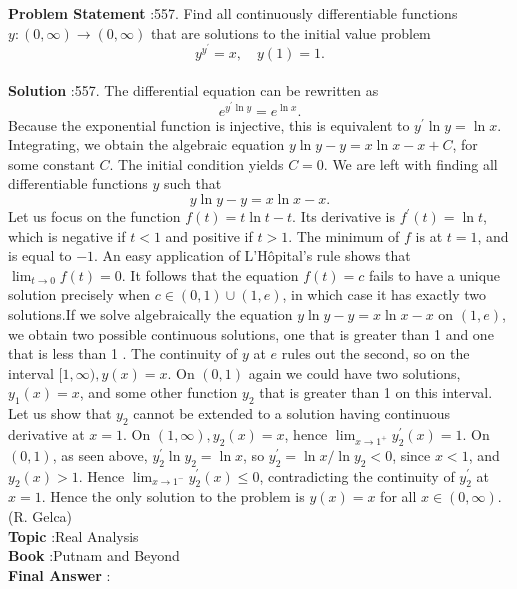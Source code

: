 \documentclass[10pt]{article}
\begin{document}
\textbf{Problem Statement} :557. Find all continuously differentiable functions $y:(0, \infty) \rightarrow(0, \infty)$ that are solutions to the initial value problem$$ y^{y^{\prime}}=x, \quad y(1)=1 . $$\\
\textbf{Solution} :557. The differential equation can be rewritten as$$ e^{y^{\prime} \ln y}=e^{\ln x} . $$Because the exponential function is injective, this is equivalent to $y^{\prime} \ln y=\ln x$. Integrating, we obtain the algebraic equation $y \ln y-y=x \ln x-x+C$, for some constant $C$. The initial condition yields $C=0$. We are left with finding all differentiable functions $y$ such that$$ y \ln y-y=x \ln x-x . $$Let us focus on the function $f(t)=t \ln t-t$. Its derivative is $f^{\prime}(t)=\ln t$, which is negative if $t<1$ and positive if $t>1$. The minimum of $f$ is at $t=1$, and is equal to $-1$. An easy application of L'Hôpital's rule shows that $\lim _{t \rightarrow 0} f(t)=0$. It follows that the equation $f(t)=c$ fails to have a unique solution precisely when $c \in(0,1) \cup(1, e)$, in which case it has exactly two solutions.If we solve algebraically the equation $y \ln y-y=x \ln x-x$ on $(1, e)$, we obtain two possible continuous solutions, one that is greater than 1 and one that is less than 1 . The continuity of $y$ at $e$ rules out the second, so on the interval $[1, \infty), y(x)=x$. On $(0,1)$ again we could have two solutions, $y_{1}(x)=x$, and some other function $y_{2}$ that is greater than 1 on this interval. Let us show that $y_{2}$ cannot be extended to a solution having continuous derivative at $x=1$. On $(1, \infty), y_{2}(x)=x$, hence $\lim _{x \rightarrow 1^{+}} y_{2}^{\prime}(x)=1$. On $(0,1)$, as seen above, $y_{2}^{\prime} \ln y_{2}=\ln x$, so $y_{2}^{\prime}=\ln x / \ln y_{2}<0$, since $x<1$, and $y_{2}(x)>1$. Hence $\lim _{x \rightarrow 1^{-}} y_{2}^{\prime}(x) \leq 0$, contradicting the continuity of $y_{2}^{\prime}$ at $x=1$. Hence the only solution to the problem is $y(x)=x$ for all $x \in(0, \infty)$.(R. Gelca)\\
\textbf{Topic} :Real Analysis\\
\textbf{Book} :Putnam and Beyond\\
\textbf{Final Answer} :\\
\end{document}
